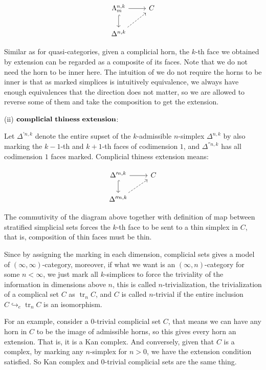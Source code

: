 \documentclass[11pt]{article}
\DeclareMathOperator{\tr}{tr}
\begin{document}
$$\begin{tikzcd}
	\Lambda^{n,k}_m \arrow[d, hook] \arrow[r, rightarrow]
	& C \\
	\Delta^{n,k}\arrow[ur, dashrightarrow]
\end{tikzcd}$$



Similar as for quasi-categories, given a complicial horn, the $k$-th face we obtained by extension can be regarded as a composite of its faces. Note that we do not need the horn to be inner here. The intuition of we do not require the horns to be inner is that as marked simplices is intuitively equivalence, we always have enough equivalences that the direction does not matter, so we are allowed to reverse some of them and take the composition to get the extension.


(ii) $\bf complicial \ thiness \ extension$: 

Let $\Delta^{'n,k}$ denote the entire supset of the $k$-admissible $n$-simplex $\Delta^{n,k}$ by also marking the $k-1$-th and $k+1$-th faces of codimension $1$, and $\Delta^{''n,k}$ has all codimension $1$ faces marked. Complicial thiness extension means:

$$\begin{tikzcd}
	\Delta'^{n,k} \arrow[d, hook] \arrow[r, rightarrow]
	& C \\
	\Delta''^{n,k}\arrow[ur, dashrightarrow]
\end{tikzcd}$$


The commutivity of the diagram above together with definition of map between stratified simplicial sets forces the $k$-th face to be sent to a thin simplex in $C$, that is, composition of thin faces must be thin.

Since by assigning the marking in each dimension, complicial sets gives a model of $(\infty,\infty)$-category, moreover, if what we want is an $(\infty,n)$-category for some $n<\infty$, we just mark all $k$-simplices to force the triviality of the information in dimensions above $n$, this is called $n$-trivialization, the trivialization of a complical set $C$ as $\tr_nC$, and $C$ is called $n$-trivial if the entire inclusion $C\hookrightarrow_e \tr_nC$ is an isomorphism.

For an example, consider a $0$-trivial complicial set $C$, that means we can have any horn in $C$ to be the image of admissible horns, so this gives every horn an extension. That is, it is a Kan complex. And conversely, given that $C$ is a complex, by marking any $n$-simplex for $n>0$, we have the extension condition satisfied. So Kan complex and $0$-trivial complicial sets are the same thing. 
\end{document}
